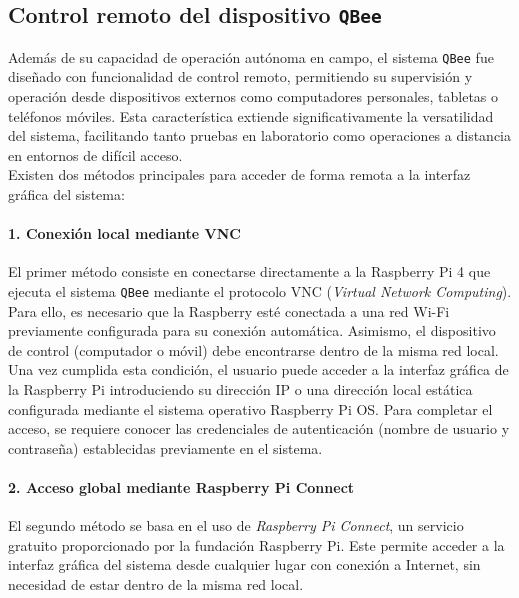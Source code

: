   \subsection{Control remoto del dispositivo \texttt{QBee}}

  Además de su capacidad de operación autónoma en campo, el sistema \texttt{QBee} fue diseñado con funcionalidad de control remoto, permitiendo su supervisión y operación desde dispositivos externos como computadores personales, tabletas o teléfonos móviles. Esta característica extiende significativamente la versatilidad del sistema, facilitando tanto pruebas en laboratorio como operaciones a distancia en entornos de difícil acceso.\\
  
  Existen dos métodos principales para acceder de forma remota a la interfaz gráfica del sistema:
  
  \paragraph{1. Conexión local mediante VNC}
  
  El primer método consiste en conectarse directamente a la Raspberry Pi 4 que ejecuta el sistema \texttt{QBee} mediante el protocolo VNC (\textit{Virtual Network Computing}). Para ello, es necesario que la Raspberry esté conectada a una red Wi-Fi previamente configurada para su conexión automática. Asimismo, el dispositivo de control (computador o móvil) debe encontrarse dentro de la misma red local.\\
  
  Una vez cumplida esta condición, el usuario puede acceder a la interfaz gráfica de la Raspberry Pi introduciendo su dirección IP o una dirección local estática configurada mediante el sistema operativo Raspberry Pi OS. Para completar el acceso, se requiere conocer las credenciales de autenticación (nombre de usuario y contraseña) establecidas previamente en el sistema.
  
  \paragraph{2. Acceso global mediante Raspberry Pi Connect}
  
  El segundo método se basa en el uso de \textit{Raspberry Pi Connect}, un servicio gratuito proporcionado por la fundación Raspberry Pi. Este permite acceder a la interfaz gráfica del sistema desde cualquier lugar con conexión a Internet, sin necesidad de estar dentro de la misma red local.\\
  
